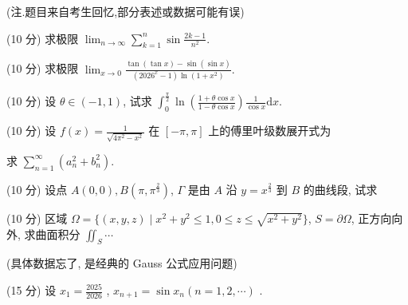 (注.题目来自考生回忆,部分表述或数据可能有误)\par
(10 分) 求极限 $\lim_{n\to \infty}\sum_{k = 1}^{n}\sin \frac{2k - 1}{n^2}.$\par
(10 分) 求极限 $\lim_{x\to 0}\frac{\tan(\tan x) - \sin(\sin x)}{(2026^x - 1)\ln(1 + x^2)}.$\par
(10 分) 设 $\theta \in (-1, 1)$, 试求 $\int_{0}^{\frac{\pi}{2}} \ln \left( \frac{1 + \theta \cos x}{1 - \theta \cos x} \right) \frac{1}{\cos x} \mathrm{d}x$.\par
\par{}
(10 分) 设 $f(x) = \frac{1}{\sqrt{4\pi^2 - x^2}}$ 在 $[- \pi, \pi]$ 上的傅里叶级数展开式为\par
\nopagebreak[4]
求 $\sum_{n=1}^{\infty}(a_n^2 + b_n^2)$.\par
\par{}
(10 分) 设点 $A(0,0), B(\pi, \pi^{\frac{2}{3}})$, $\Gamma$ 是由 $A$ 沿 $y = x^{\frac{2}{3}}$ 到 $B$ 的曲线段, 试求\par
\nopagebreak[4]
(10 分) 区域 $\Omega = \{(x, y, z) \mid x^2 + y^2 \leq 1, 0 \leq z \leq \sqrt{x^2 + y^2}\}$, $S = \partial \Omega$, 正方向向外, 求曲面积分 $\iint_S\cdots$\par
(具体数据忘了, 是经典的 Gauss 公式应用问题)\par
(15 分) 设  $x_{1}=\frac{2025}{2026}$ ,  $x_{n+1}=\sin x_{n}(n=1,2,\cdots)$ .\par
